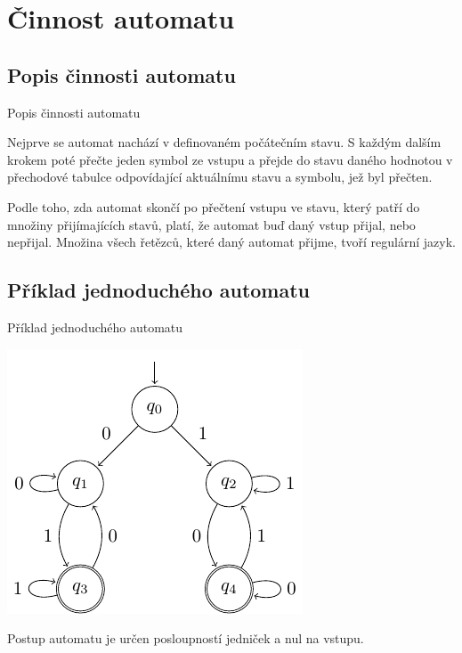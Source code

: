 \documentclass[utf8x]{beamer}
\begin{document}
\section{Činnost automatu}

\subsection{Popis činnosti automatu}

\begin{frame}{Popis činnosti automatu}

Nejprve se automat nachází v definovaném počátečním stavu. S každým dalším krokem poté přečte jeden symbol ze vstupu a přejde do stavu daného hodnotou v přechodové tabulce odpovídající aktuálnímu stavu a symbolu, jež byl přečten.

\pause
\vspace{3mm}

Podle toho, zda automat skončí po přečtení vstupu ve stavu, který patří do množiny přijímajících stavů, platí, že automat buď daný vstup přijal, nebo nepřijal. Množina všech řetězců, které daný automat přijme, tvoří regulární jazyk.
    
\end{frame}

\subsection{Příklad jednoduchého automatu}

\begin{frame}{Příklad jednoduchého automatu}

\begin{center}
    \includegraphics[]{konecny-automat.png}
\end{center}

Postup automatu je určen posloupností jedniček a nul na vstupu.

\end{frame}
\end{document}
